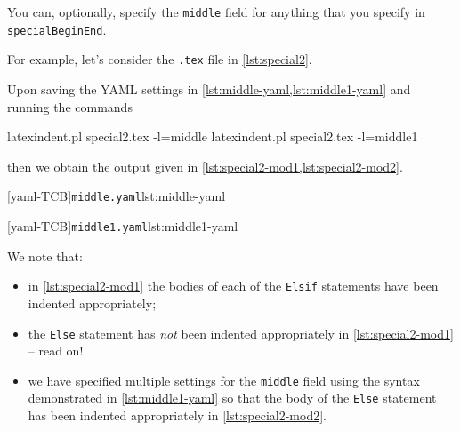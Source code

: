  You can, optionally, specify  the
 \texttt{middle} field for anything that you specify in \texttt{specialBeginEnd}.

 \begin{example}
 For example, let's consider the \texttt{.tex} file in \cref{lst:special2}.


 Upon saving the YAML settings in \cref{lst:middle-yaml,lst:middle1-yaml} and running the
 commands 

 \begin{commandshell}
latexindent.pl special2.tex -l=middle
latexindent.pl special2.tex -l=middle1
\end{commandshell}

 then we obtain the output given in \cref{lst:special2-mod1,lst:special2-mod2}.

 \begin{cmhtcbraster}
  [yaml-TCB]{\texttt{middle.yaml}}{lst:middle-yaml}
 \end{cmhtcbraster}

 \begin{cmhtcbraster}
  [yaml-TCB]{\texttt{middle1.yaml}}{lst:middle1-yaml}
 \end{cmhtcbraster}

 We note that:
 \begin{itemize}
  \item in \cref{lst:special2-mod1} the bodies of each of the \texttt{Elsif} statements
        have been indented appropriately;
  \item the \texttt{Else} statement has \emph{not} been indented appropriately in
        \cref{lst:special2-mod1} -- read on!
  \item we have specified multiple settings for the \texttt{middle} field using the
        syntax demonstrated in \cref{lst:middle1-yaml} so that the body of the
        \texttt{Else} statement has been indented appropriately in
        \cref{lst:special2-mod2}.
 \end{itemize}
 \end{example}

